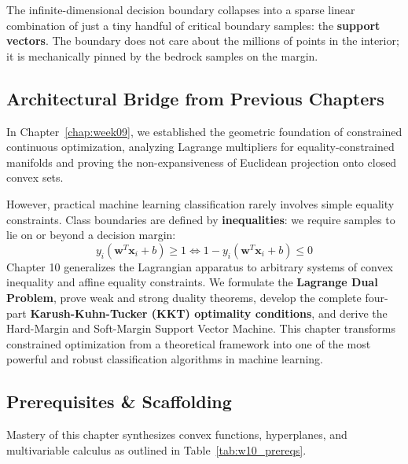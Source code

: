 The infinite-dimensional decision boundary collapses into a sparse linear combination of just a tiny handful of critical boundary samples: the \textbf{support vectors}. The boundary does not care about the millions of points in the interior; it is mechanically pinned by the bedrock samples on the margin.

\subsection{Architectural Bridge from Previous Chapters}
In Chapter~\ref{chap:week09}, we established the geometric foundation of constrained continuous optimization, analyzing Lagrange multipliers for equality-constrained manifolds and proving the non-expansiveness of Euclidean projection onto closed convex sets. 

However, practical machine learning classification rarely involves simple equality constraints. Class boundaries are defined by \textbf{inequalities}: we require samples to lie on or beyond a decision margin:
\begin{equation}
y_i(\mathbf{w}^T \mathbf{x}_i + b) \ge 1 \iff 1 - y_i(\mathbf{w}^T \mathbf{x}_i + b) \le 0
\end{equation}
Chapter 10 generalizes the Lagrangian apparatus to arbitrary systems of convex inequality and affine equality constraints. We formulate the \textbf{Lagrange Dual Problem}, prove weak and strong duality theorems, develop the complete four-part \textbf{Karush-Kuhn-Tucker (KKT) optimality conditions}, and derive the Hard-Margin and Soft-Margin Support Vector Machine. This chapter transforms constrained optimization from a theoretical framework into one of the most powerful and robust classification algorithms in machine learning.

\subsection{Prerequisites \& Scaffolding}
Mastery of this chapter synthesizes convex functions, hyperplanes, and multivariable calculus as outlined in Table~\ref{tab:w10_prereqs}.

